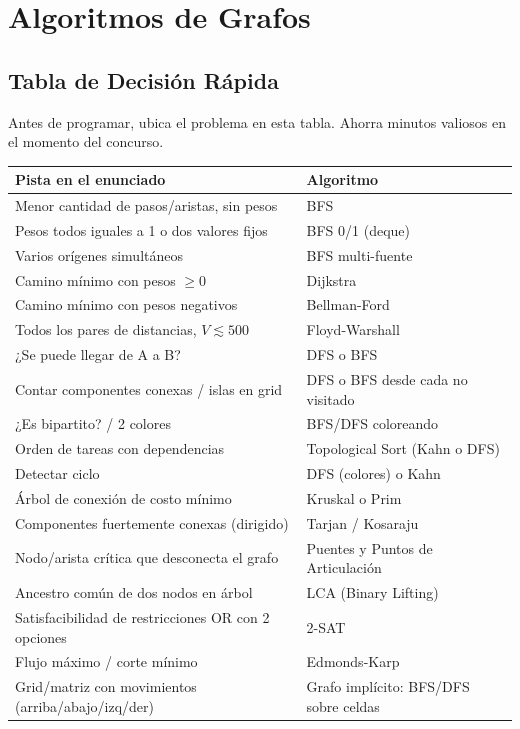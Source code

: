 \documentclass[10pt,twocolumn,letterpaper]{report}
\begin{document}
\chapter{Algoritmos de Grafos}

\section{Tabla de Decisión Rápida}
Antes de programar, ubica el problema en esta tabla. Ahorra minutos valiosos en el momento del concurso.

\begin{center}
\scriptsize
\begin{tabular}{|p{3.1cm}|p{3.3cm}|}
\hline
\textbf{Pista en el enunciado} & \textbf{Algoritmo} \\
\hline
Menor cantidad de pasos/aristas, sin pesos & BFS \\
\hline
Pesos todos iguales a 1 o dos valores fijos & BFS 0/1 (deque) \\
\hline
Varios orígenes simultáneos & BFS multi-fuente \\
\hline
Camino mínimo con pesos $\geq 0$ & Dijkstra \\
\hline
Camino mínimo con pesos negativos & Bellman-Ford \\
\hline
Todos los pares de distancias, $V \lesssim 500$ & Floyd-Warshall \\
\hline
¿Se puede llegar de A a B? & DFS o BFS \\
\hline
Contar componentes conexas / islas en grid & DFS o BFS desde cada no visitado \\
\hline
¿Es bipartito? / 2 colores & BFS/DFS coloreando \\
\hline
Orden de tareas con dependencias & Topological Sort (Kahn o DFS) \\
\hline
Detectar ciclo & DFS (colores) o Kahn \\
\hline
Árbol de conexión de costo mínimo & Kruskal o Prim \\
\hline
Componentes fuertemente conexas (dirigido) & Tarjan / Kosaraju \\
\hline
Nodo/arista crítica que desconecta el grafo & Puentes y Puntos de Articulación \\
\hline
Ancestro común de dos nodos en árbol & LCA (Binary Lifting) \\
\hline
Satisfacibilidad de restricciones OR con 2 opciones & 2-SAT \\
\hline
Flujo máximo / corte mínimo & Edmonds-Karp \\
\hline
Grid/matriz con movimientos (arriba/abajo/izq/der) & Grafo implícito: BFS/DFS sobre celdas \\
\hline
\end{tabular}
\end{center}
\end{document}
